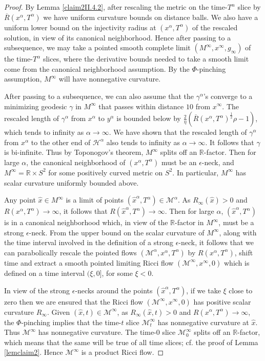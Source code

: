 \documentclass[12pt]{amsart}
\newcommand{\al}{\alpha}
\newcommand{\h}{{\mathcal H}}
\newcommand{\M}{{\mathcal M}}
\newcommand{\R}{{\mathbb R}}
\newcommand{\ga}{\gamma}
\numberwithin{equation}{section}
\theoremstyle{plain}
\theoremstyle{definition}
\theoremstyle{remark}
\begin{document}
\begin{proof}
By Lemma \ref{claim2II.4.2}, after rescaling the metric on the
time-$T^\alpha$ slice by $\overline{R}(x^\al,T^\al)$ we have uniform curvature
bounds on distance balls.
We also have a uniform lower bound on the injectivity radius at
$(x^\al,T^\al)$ of the rescaled solution, in view of its
canonical neighborhood.  Hence after passing to
a subsequence, we may take a pointed 
smooth complete limit $(M^\infty, x^\infty, g_\infty)$
of the time-$T^\al$ slices, where the derivative bounds needed to
take a smooth limit come from the canonical neighborhood assumption.
By the $\Phi$-pinching
assumption, $M^\infty$ will have nonnegative curvature.

After passing to a subsequence, we can also assume that 
the $\ga^\al$'s converge to
a minimizing geodesic $\gamma$ in $M^\infty$ that passes within distance $10$
from $x^\infty$. 
The
rescaled length of $\gamma^\al$ from $x^\al$ to $y^\al$ is
bounded below by $\frac{2}{\eta} \left( \overline{R}(x^\al, T^\al)^{\frac12} \rho - 1 \right)$,
which tends to infinity as $\al \rightarrow \infty$.
We have shown that the rescaled length of $\gamma^\al$ from 
$x^\al$ to the other end of $\h^\al$ also tends to infinity as
$\al \rightarrow \infty$.
It follows that $\gamma$ is bi-infinite. 
Thus by Toponogov's
theorem, $M^\infty$ splits off an $\R$-factor. Then for large $\al$,
the canonical neighborhood of $(x^\al,T^\al)$
must be an $\epsilon$-neck, and $M^\infty = \R \times S^2$
for some positively curved metric on $S^2$.  In particular,
$M^\infty$ has scalar curvature uniformly bounded above.

Any point
$\widehat{x} \in M^\infty$ is a limit of points
$(\widehat{x}^\alpha, T^\alpha) \in \M^\alpha$. As 
$R_\infty(\widehat{x}) > 0$ and $R(x^\al,T^\al) \rightarrow \infty$, it
follows that $R(\widehat{x}^\alpha, T^\alpha) \rightarrow \infty$. Then
for large $\alpha$, $(\widehat{x}^\al,T^\al)$ is in a canonical
neighborhood which, in view of the $\R$-factor in $M^\infty$, must 
be a strong $\epsilon$-neck.  From the upper bound on the scalar
curvature of $M^\infty$, along with the time interval involved in
the definition of a strong $\epsilon$-neck, it follows that
we can parabolically rescale the pointed flows 
$(\M^\al,x^\al,T^\al)$ by $R(x^\al,T^\al)$, shift
time and
extract a smooth pointed limiting Ricci flow 
$(\M^\infty,x^\infty,0)$ which is defined on a time
interval $(\xi,0]$, for some $\xi<0$.  

In view of the strong $\epsilon$-necks around the
points $(\widehat{x}^\alpha, T^\alpha)$, if we take 
$\xi$ close to zero
then we are ensured that the Ricci flow
$(\M^\infty,x^\infty,0)$ has positive
scalar curvature $R_\infty$. Given $(\widehat{x}, t) \in \M^\infty$, 
as $R_\infty(\widehat{x}, t) > 0$ and $R(x^\al,T^\al) \rightarrow \infty$, 
the $\Phi$-pinching implies that
the time-$t$ slice $\M^\infty_t$ has nonnegative curvature at
$\widehat{x}$. Thus $\M^\infty$ has nonnegative curvature.
The time-$0$ slice $\M^\infty_0$
splits off an $\R$-factor,
which means that the same will be true of all time slices;
cf. the proof of Lemma \ref{lemclaim2}. Hence 
$\M^\infty$ is a product Ricci flow.


\end{proof}
\end{document}
